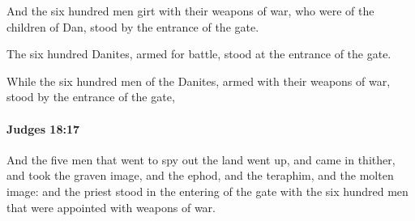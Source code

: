 			\begin{versebox}
					\item[BHS] 
					\item[ASV] And the six hundred men girt with their weapons of war, who were of the children of Dan, stood by the entrance of the gate.
					\item[NIV] The six hundred Danites, armed for battle, stood at the entrance of the gate.
					\item[NRSV] While the six hundred men of the Danites, armed with their weapons of war, stood by the entrance of the gate,
			\end{versebox}

		\paragraph{Judges 18:17} %
			\label{JUDGES-18-17}

			And the five men that went to spy out the land went up, and came in thither, and took the graven image, and the ephod, and the teraphim, and the molten image: and the priest stood in the entering of the gate with the six hundred men that were appointed with weapons of war.

